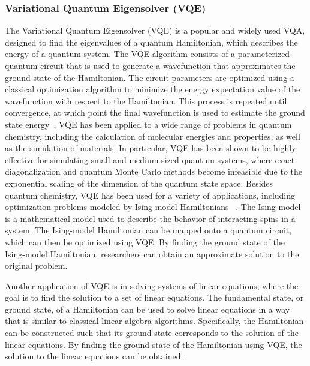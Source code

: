 \subsubsection{Variational Quantum Eigensolver (VQE)}
The Variational Quantum Eigensolver (VQE) is a popular and widely used VQA, designed to find the eigenvalues of a quantum Hamiltonian,
which describes the energy of a quantum system. The VQE algorithm consists of a parameterized quantum circuit that is used to generate a
wavefunction that approximates the ground state of the Hamiltonian. The circuit parameters are optimized using a classical optimization
algorithm to minimize the energy expectation value of the wavefunction with respect to the Hamiltonian. This process is repeated until convergence,
at which point the final wavefunction is used to estimate the ground state energy~\cite{peruzzo2014variational}.
VQE has been applied to a wide range of problems in quantum chemistry, including the calculation of molecular energies
and properties, as well as the simulation of materials. In particular, VQE has been shown to be highly effective for
simulating small and medium-sized quantum systems, where exact diagonalization and quantum Monte Carlo methods become infeasible
due to the exponential scaling of the dimension of the quantum state space.
Besides quantum chemistry, VQE has been used for a variety of applications, including optimization problems modeled by
Ising-model Hamiltonians \cite{moll2018introduction} ~\cite{lucas2014ising}.
The Ising model is a mathematical model used to describe the behavior of interacting spins in a system.
The Ising-model Hamiltonian can be mapped onto a quantum circuit, which can then be optimized using VQE\cite{moll2018introduction}.
By finding the ground state of the Ising-model Hamiltonian, researchers can obtain an approximate solution to the original problem.

Another application of VQE is in solving systems of linear equations, where the goal is to find the solution to a set
of linear equations. The fundamental state, or ground state, of a Hamiltonian can be used to solve linear equations
in a way that is similar to classical linear algebra algorithms. Specifically, the Hamiltonian can be constructed
such that its ground state corresponds to the solution of the linear equations. By finding the ground state of the
Hamiltonian using VQE, the solution to the linear equations can be obtained~\cite{harrow2009quantum}.


